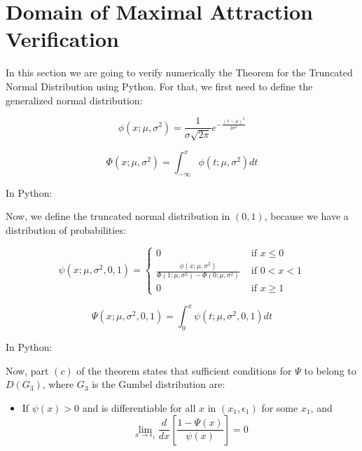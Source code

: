 \chapter{Domain of Maximal Attraction Verification}
\label{ap:theoremVer}

In this section we are going to verify numerically the Theorem for the Truncated Normal Distribution using Python. For that, we first need to define the generalized normal distribution:

\begin{equation} \label{eq:Normal_PDF}
\phi (x; \mu, \sigma^2) = \frac{1}{\sigma \sqrt{2 \pi}} e^{-\frac{\left( x - \mu \right)^2}{2\sigma^2}}
\end{equation}

\begin{equation} \label{eq:Normal_CDF}
\Phi (x; \mu, \sigma^2) = \int_{-\infty} ^x \phi (t;\mu,\sigma^2) dt
\end{equation}

In Python:

Now, we define the truncated normal distribution in $(0,1)$, because we have a distribution of probabilities:

\begin{equation} \label{eq:TNormal_PDF}
\psi (x; \mu, \sigma^2,0,1) = 
\begin{cases}
0 & \text{ if } x \leq 0 \\
\frac{\phi(x;\mu, \sigma^2)}{\Phi (1; \mu, \sigma^2)-\Phi (0; \mu, \sigma^2)} & \text{ if } 0 < x < 1 \\
0 & \text{ if } x \geq 1
\end{cases}
\end{equation}

\begin{equation} \label{eq:TNormal_CDF}
\Psi (x; \mu, \sigma^2,0,1) = \int_{0} ^x \psi (t;\mu,\sigma^2,0,1) dt
\end{equation}

In Python:

Now, part $(c)$ of the theorem states that sufficient conditions for $\Psi$ to belong to $D(G_3)$, where $G_3$ is the Gumbel distribution are:

\begin{itemize}
\item If $\psi(x) >0$ and is differentiable for all $x$ in $(x_1,\epsilon_1)$ for some $x_1$, and
\begin{equation} \label{eq:partC_theorem}
\lim_{x \rightarrow \epsilon_1} \frac{d}{dx} \left[ \frac{1-\Psi(x)}{\psi(x)} \right] = 0
\end{equation}
\end{itemize}

